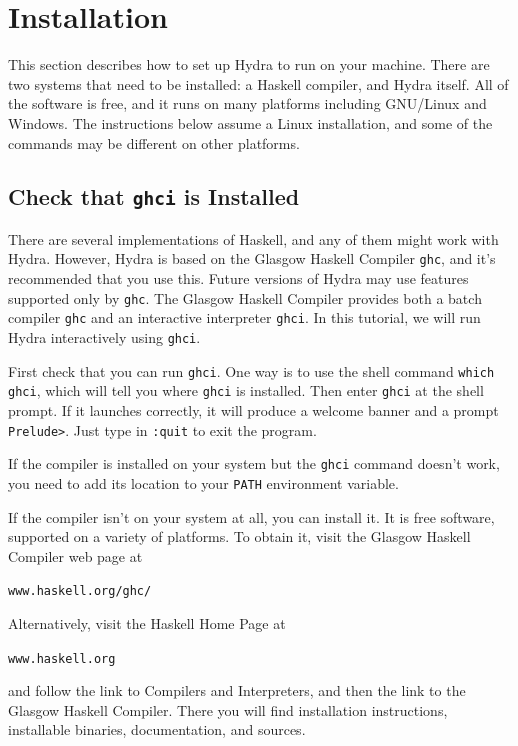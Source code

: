 \documentclass[a4paper,openany,fleqn]{book}
\begin{document}
\appendix

\chapter{Installation}
\label{sec:installation}

This section describes how to set up Hydra to run on your machine.  There
are two systems that need to be installed: a Haskell compiler, and
Hydra itself.  All of the software is free, and it runs on many
platforms including GNU/Linux and Windows.  The instructions below
assume a Linux installation, and some of the commands may be different
on other platforms.

\section{Check that \texttt{ghci} is Installed}
\label{sec:install-ghc}

There are several implementations of Haskell, and any of them might
work with Hydra.  However, Hydra is based on the Glasgow Haskell
Compiler \texttt{ghc}, and it's recommended that you use this.  Future
versions of Hydra may use features supported only by \texttt{ghc}. The
Glasgow Haskell Compiler provides both a batch compiler \texttt{ghc}
and an interactive interpreter \texttt{ghci}.  In this tutorial, we
will run Hydra interactively using \texttt{ghci}.

First check that you can run \texttt{ghci}.  One way is to use the
shell command \texttt{which ghci}, which will tell you where
\texttt{ghci} is installed.  Then enter \texttt{ghci} at the shell
prompt.  If it launches correctly, it will produce a welcome banner
and a prompt \texttt{Prelude>}.  Just type in \texttt{:quit} to exit
the program.

If the compiler is installed on your system but the \texttt{ghci}
command doesn't work, you need to add its location to your
\texttt{PATH} environment variable.

If the compiler isn't on your system at all, you can install it.  It
is free software, supported on a variety of platforms.  To obtain it,
visit the Glasgow Haskell Compiler web page at
\begin{center}
\texttt{www.haskell.org/ghc/}
\end{center}
Alternatively, visit the Haskell Home Page at
\begin{center}
\texttt{www.haskell.org}
\end{center}
and follow the link to Compilers and Interpreters, and then the link
to the Glasgow Haskell Compiler.  There you will find installation
instructions, installable binaries, documentation, and sources.
\end{document}
